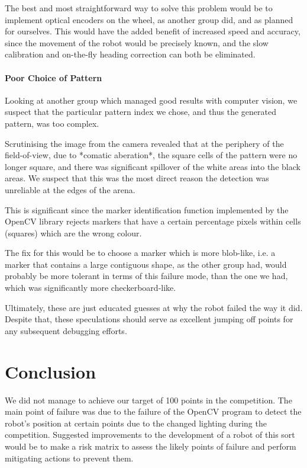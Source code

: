 \documentclass{article}
\begin{document}
The best and most straightforward way to solve this problem would be to implement optical encoders on the wheel, as another group did, and as planned for ourselves. This would have the added benefit of increased speed and accuracy, since the movement of the robot would be precisely known, and the slow calibration and on-the-fly heading correction can both be eliminated.

\paragraph{Poor Choice of Pattern}
Looking at another group which managed good results with computer vision, we suspect that the particular pattern index we chose, and thus the generated pattern, was too complex.

Scrutinising the image from the camera revealed that at the periphery of the field-of-view, due to *comatic aberation*, the square cells of the pattern were no longer square, and there was significant spillover of the white areas into the black areas. We suspect that this was the most direct reason the detection was unreliable at the edges of the arena.

This is significant since the marker identification function implemented by the OpenCV library rejects markers that have a certain percentage pixels within cells (squares) which are the wrong colour.

The fix for this would be to choose a marker which is more blob-like, i.e. a marker that contains a large contiguous shape, as the other group had, would probably be more tolerant in terms of this failure mode, than the one we had, which was significantly more checkerboard-like.

Ultimately, these are just educated guesses at why the robot failed the way it did. Despite that, these speculations should serve as excellent jumping off points for any subsequent debugging efforts.

\section{Conclusion}
    \quad We did not manage to achieve our target of 100 points in the competition. The main point of failure was due to the failure of the OpenCV program to detect the robot's position at certain points due to the changed lighting during the competition. Suggested improvements to the development of a robot of this sort would be to make a risk matrix to assess the likely points of failure and perform mitigating actions to prevent them.
\end{document}
